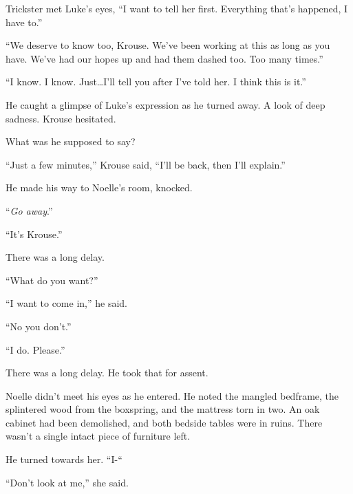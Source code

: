 Trickster met Luke's eyes, ``I want to tell her first.  Everything that's happened, I have to.''



``We deserve to know too, Krouse.  We've been working at this as long as you have.  We've had our hopes up and had them dashed too.  Too many times.''



``I know.  I know.  Just\ldots I'll tell you after I've told her.  I think this is it.''



He caught a glimpse of Luke's expression as he turned away.  A look of deep sadness.  Krouse hesitated.



What was he supposed to say?



``Just a few minutes,'' Krouse said, ``I'll be back, then I'll explain.''



He made his way to Noelle's room, knocked.



``\emph{Go away}.''



``It's Krouse.''



There was a long delay.



``What do you want?''



``I want to come in,'' he said.



``No you don't.''



``I do.  Please.''



There was a long delay.  He took that for assent.



Noelle didn't meet his eyes as he entered.  He noted the mangled bedframe, the splintered wood from the boxspring, and the mattress torn in two.  An oak cabinet had been demolished, and both bedside tables were in ruins.  There wasn't a single intact piece of furniture left.



He turned towards her.  ``I-``



``Don't look at me,'' she said.



